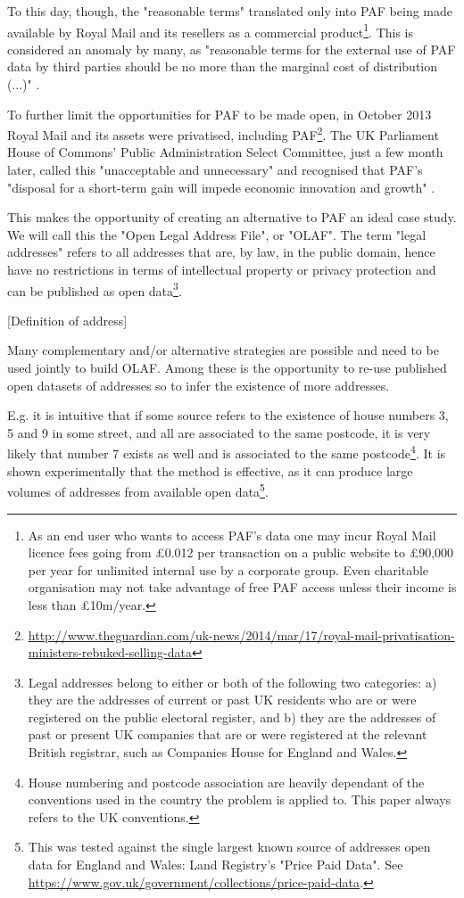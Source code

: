     To this day, though, the "reasonable terms" translated only into PAF being made available by Royal Mail and its resellers as a commercial product\footnote{As an end user who wants to access PAF's data one may incur Royal Mail licence fees going from \pounds0.012 per transaction on a public website to \pounds90,000 per year for unlimited internal use by a corporate group. Even charitable organisation may not take advantage of free PAF access unless their income is less than \pounds10m/year.}. This is considered an anomaly by many, as "reasonable terms for the external use of PAF data by third parties should be no more than the marginal cost of distribution (...)" \cite{odugresponse}. 

    To further limit the opportunities for PAF to be made open, in October 2013 Royal Mail and its assets were privatised, including PAF\footnote{\url{http://www.theguardian.com/uk-news/2014/mar/17/royal-mail-privatisation-ministers-rebuked-selling-data}}. The UK Parliament House of Commons' Public Administration Select Committee, just a few month later, called this "unacceptable and unnecessary" and recognised that PAF's "disposal for a short-term gain will impede economic innovation and growth" \cite{pascod}.

    This makes the opportunity of creating an alternative to PAF an ideal case study. We will call this the "Open Legal Address File", or "OLAF". The term "legal addresses" refers to all addresses that are, by law, in the public domain, hence have no restrictions in terms of intellectual property or privacy protection and can be published as open data\footnote{Legal addresses belong to either or both of the following two categories: a) they are the addresses of current or past UK residents who are or were registered on the public electoral register, and b) they are the addresses of past or present UK companies that are or were registered at the relevant British registrar, such as Companies House for England and Wales.}.

    {[}Definition of address{]}
    
    Many complementary and/or alternative strategies are possible and need to be used jointly to build OLAF. Among these is the opportunity to re-use published open datasets of addresses so to infer the existence of more addresses. 
    
    E.g. it is intuitive that if some source refers to the existence of house numbers 3, 5 and 9 in some street, and all are associated to the same postcode, it is very likely that number 7 exists as well and is associated to the same postcode\footnote{House numbering and postcode association are heavily dependant of the conventions used in the country the problem is applied to. This paper always refers to the UK conventions.}. It is shown experimentally that the method is effective, as it can produce large volumes of addresses from available open data\footnote{This was tested against the single largest known source of addresses open data for England and Wales: Land Registry's "Price Paid Data". See \url{https://www.gov.uk/government/collections/price-paid-data}.}.
    
